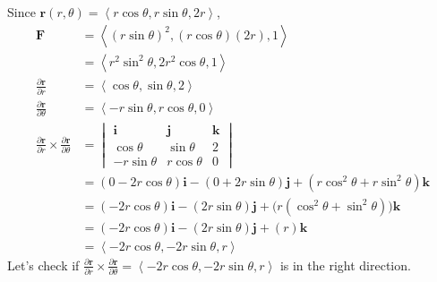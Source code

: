 \documentclass{article}
\newcommand{\lrp}[1]{\left( #1 \right)}
\newcommand{\lra}[1]{\left\langle #1 \right\rangle}
\renewcommand{\i}[0]{\mathbf{i}}
\renewcommand{\j}[0]{\mathbf{j}}
\renewcommand{\k}[0]{\mathbf{k}}
\renewcommand{\r}[0]{\mathbf{r}}
\newcommand{\F}[0]{\mathbf{F}}
\begin{document}
Since $\r(r,\theta)=\lra{r\cos\theta, r\sin\theta, 2r}$,
\begin{align*}
\F&=\lra{(r\sin\theta)^2, (r\cos\theta)(2r), 1}\\
&=\lra{r^2\sin^2\theta, 2r^2\cos\theta, 1}\\
    \frac{\partial \r}{\partial r}&=\lra{\cos\theta, \sin\theta, 2}\\
    \frac{\partial \r}{\partial \theta}&=\lra{-r\sin\theta, r\cos\theta, 0}\\
    \frac{\partial \r}{\partial r}\times \frac{\partial \r}{\partial \theta}&=\begin{vmatrix}\i & \j & \k \\ \cos\theta & \sin\theta & 2\\ -r\sin\theta & r\cos\theta & 0\end{vmatrix}\\
    &=\lrp{0-2r\cos\theta}\i -\lrp{0+2r\sin\theta}\j + \lrp{r\cos^2\theta + r\sin^2\theta}\k\\
    &=\lrp{-2r\cos\theta}\i -\lrp{2r\sin\theta}\j + \big(r\lrp{\cos^2\theta+\sin^2\theta}\big)\k\\
    &=\lrp{-2r\cos\theta}\i -\lrp{2r\sin\theta}\j +\lrp{r}\k\tag{$\cos^2\theta+\sin^2\theta=1$}\\
    &=\lra{-2r\cos\theta, -2r\sin\theta, r}
\end{align*}
Let's check if $\displaystyle \frac{\partial \r}{\partial r}\times  \frac{\partial \r }{\partial \theta}=\lra{-2r\cos\theta, -2r\sin\theta, r}$ is in the right direction.
\end{document}

